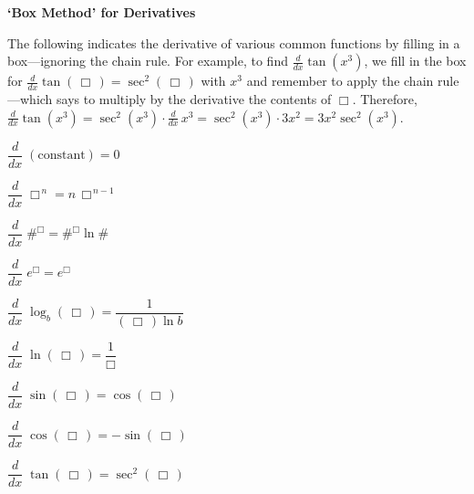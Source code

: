 \documentclass[11pt,letterpaper]{article}
\newenvironment{2enumerate}{%
	\begin{itemize}
	\begin{multicols}{2}
	}{%
	\end{multicols}
	\end{itemize}
}
\begin{document}
\begin{center} {\bfseries\LARGE `Box Method' for Derivatives} \end{center}

The following indicates the derivative of various common functions by filling in a box---ignoring the chain rule. For example, to find $\frac{d}{dx} \tan(x^3)$, we fill in the box for $\frac{d}{dx} \tan \left(\, \Box \,\right)= \sec^2 \left(\, \Box \,\right)$ with $x^3$ and remember to apply the chain rule---which says to multiply by the derivative the contents of $\Box$. Therefore, $\frac{d}{dx} \tan \left( \boxed{x^3} \right)= \sec^2 \left( \boxed{x^3} \right) \cdot \frac{d}{dx} \, x^3= \sec^2 \left( \boxed{x^3} \right) \cdot 3x^2= 3x^2 \sec^2(x^3)$. \par\vfill

\begin{2enumerate}
\item $\dfrac{d}{dx}\; (\text{constant})= 0$ \par\vspace{0.05cm}
\item $\dfrac{d}{dx}\; \Box^{\,n} = n \, \Box^{\,n-1}$ \par\vspace{0.05cm}
\item $\dfrac{d}{dx}\; \#^\Box= \#^\Box \ln \#$ \par\vspace{0.05cm}
\item $\dfrac{d}{dx}\; e^\Box= e^\Box$ \par\vspace{0.05cm}
\item $\dfrac{d}{dx}\; \log_b \left(\, \Box \,\right) = \dfrac{1}{\left(\, \Box \,\right) \ln b}$ \par\vspace{0.05cm}
\item $\dfrac{d}{dx}\; \ln \left(\, \Box \,\right) = \dfrac{1}{\Box}$ \par\vspace{0.05cm}
\item $\dfrac{d}{dx}\; \sin \left(\, \Box \,\right) = \cos \left(\, \Box \,\right)$ \par\vspace{0.05cm} 
\item $\dfrac{d}{dx}\; \cos \left(\, \Box \,\right) = -\sin \left(\, \Box \,\right)$ \par\vspace{0.05cm} 
\item $\dfrac{d}{dx}\; \tan \left(\, \Box \,\right) = \sec^2 \left(\, \Box \,\right)$ \par\vspace{0.05cm}

\end{2enumerate}
\end{document}
